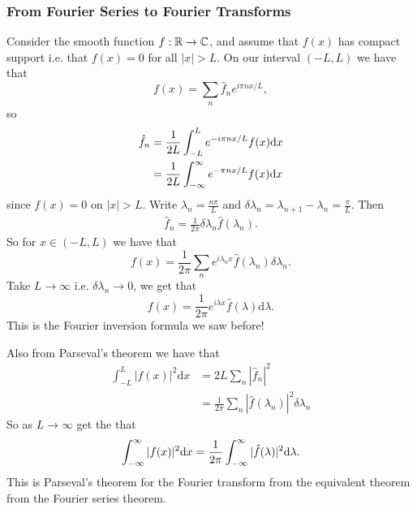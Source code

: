 \documentclass{article}
\begin{document}
\subsubsection{From Fourier Series to Fourier Transforms}
Consider the smooth function $ f:\mathbb{R}\to \mathbb{C} $, and assume that $ f(x) $ has compact support i.e. that $ f(x)=0 $ for all $ |x|> L $. On our interval $ (-L,L) $ we have that
\[
	f(x)=\sum_n\hat f_ne^{i\pi nx/L},
\]
so
\begin{align*}
	\hat f_n&=\frac1{2L}\int_{-L}^Le^{-i\pi nx/L}f(x)\mathrm dx\\
		&= \frac1{2L}\int_{-\infty}^\infty e^{-\pi n x/L}f(x)\mathrm dx
\end{align*}
since $ f(x)=0 $ on $ |x|>L $. Write $ \lambda_n=\frac{n\pi}L $ and $ \delta \lambda_n=\lambda_{n+1}-\lambda_n=\frac \pi L $. Then
\begin{align*}
	\hat f_n=\frac 1{2\pi}\delta \lambda_n\hat f(\lambda_n).
\end{align*}
So for $ x\in (-L,L) $ we have that
\[
	f(x)=\frac 1{2\pi} \sum_ne^{i\lambda_n x}\hat f(\lambda_n)\delta \lambda_n.
\]
Take $ L\to \infty $ i.e. $ \delta\lambda_n\to 0 $, we get that 
\[
	f(x)=\frac 1{2\pi}e^{i\lambda x}\hat f(\lambda)\mathrm d\lambda.
\]
This is the Fourier inversion formula we saw before!\par
Also from Parseval's theorem we have that 
\begin{align*}
	\int_{-L}^L |f(x)|^2\mathrm dx &=2L\sum_n|\hat f_n|^2\\
				       &= \frac 1{2\pi}\sum_n|\hat f(\lambda_n)|^2\delta \lambda_n
\end{align*}
So as $ L\to\infty $ get the that
\begin{align*}
	\int_{-\infty}^\infty|f(x)|^2\mathrm dx=\frac 1{2\pi}\int_{-\infty}^\infty |\hat f(\lambda)|^2\mathrm d \lambda.
\end{align*}
This is Parseval's theorem for the Fourier transform from the equivalent theorem from the Fourier series theorem.
\end{document}
